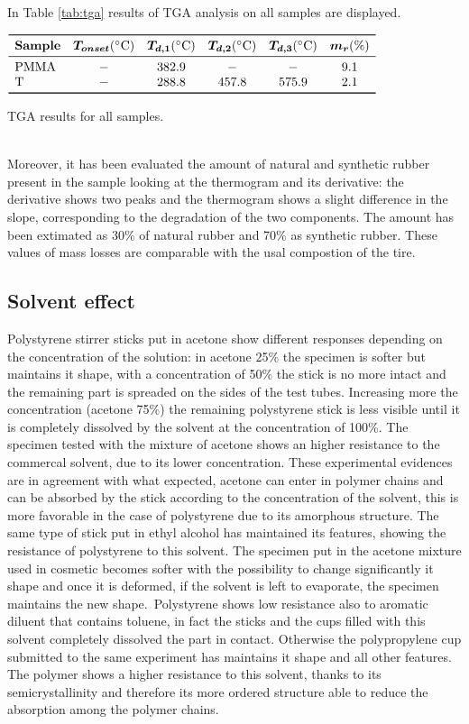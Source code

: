 \documentclass[a4paper, 11pt]{article}
\begin{document}
In Table \ref{tab:tga} results of TGA analysis on all samples are displayed. 
\begin{table}[htp]
\centering
$
\begin{array}{lccccc}
\toprule
\textbf{Sample} & \bm{T_{onset}} (\SI{}{\celsius}) & \bm{T_{d,1}} (\SI{}{\celsius}) & \bm{T_{d,2}} (\SI{}{\celsius}) & \bm{T_{d,3}} (\SI{}{\celsius}) & \bm{m_{r}} (\si{\%}) \\
\midrule
\text{PMMA} & - & 382.9 & - & - & 9.1  \\
\text{T} & - & 288.8 & 457.8 & 575.9 & 2.1  \\
\bottomrule
\end{array}
$
\caption{TGA results for all samples.}
\label{tab:tga}
\end{table}\\
Moreover, it has been evaluated the amount of natural and synthetic rubber present in the sample looking at the thermogram and its derivative: the derivative shows two peaks and the thermogram shows a slight difference in the slope, corresponding to the degradation of the two components. The amount has been extimated as 30\% of natural rubber and 70\% as synthetic rubber. These values of mass losses are comparable with the usal compostion of the tire.

\newpage

\subsection{Solvent effect}

Polystyrene stirrer sticks put in acetone show different responses depending on the concentration of the solution: in acetone 25\% the specimen is softer but maintains it shape, with a concentration of 50\% the stick is no more intact and the remaining part is spreaded on the sides of the test tubes. Increasing more the concentration (acetone 75\%) the remaining polystyrene stick is less visible until it is completely dissolved by the solvent at the concentration of 100\%. The specimen tested with the mixture of acetone shows an higher resistance to the commercal solvent, due to its lower concentration.
These experimental evidences are in agreement with what expected, acetone can enter in polymer chains and can be absorbed by the stick according to the concentration of the solvent, this is more favorable in the case of polystyrene due to its amorphous structure. The same type of stick put in ethyl alcohol has maintained its features, showing the resistance of polystyrene to this solvent. The specimen put in the acetone mixture used in cosmetic becomes softer with the possibility to change significantly it shape and once it is deformed, if the solvent is left to evaporate, the specimen maintains the new shape.\
Polystyrene shows low resistance also to aromatic diluent that contains toluene, in fact the sticks and the cups filled with this solvent completely dissolved the part in contact. Otherwise the polypropylene cup submitted to the same experiment has maintains it shape and all other features. The polymer shows a higher resistance to this solvent, thanks to its semicrystallinity and therefore its more ordered structure able to reduce the absorption among the polymer chains.
\end{document}
